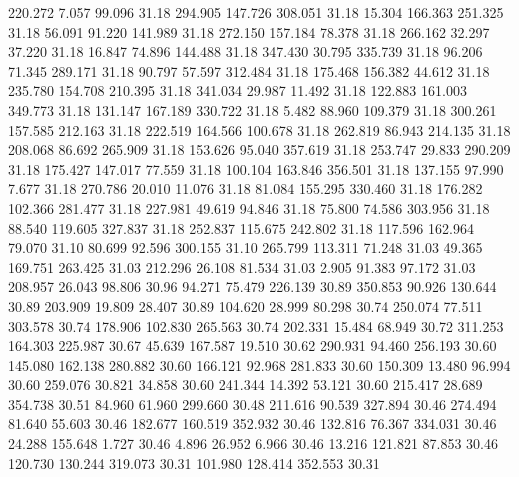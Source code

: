  220.272    7.057   99.096        31.18
 294.905  147.726  308.051        31.18
  15.304  166.363  251.325        31.18
  56.091   91.220  141.989        31.18
 272.150  157.184   78.378        31.18
 266.162   32.297   37.220        31.18
  16.847   74.896  144.488        31.18
 347.430   30.795  335.739        31.18
  96.206   71.345  289.171        31.18
  90.797   57.597  312.484        31.18
 175.468  156.382   44.612        31.18
 235.780  154.708  210.395        31.18
 341.034   29.987   11.492        31.18
 122.883  161.003  349.773        31.18
 131.147  167.189  330.722        31.18
   5.482   88.960  109.379        31.18
 300.261  157.585  212.163        31.18
 222.519  164.566  100.678        31.18
 262.819   86.943  214.135        31.18
 208.068   86.692  265.909        31.18
 153.626   95.040  357.619        31.18
 253.747   29.833  290.209        31.18
 175.427  147.017   77.559        31.18
 100.104  163.846  356.501        31.18
 137.155   97.990    7.677        31.18
 270.786   20.010   11.076        31.18
  81.084  155.295  330.460        31.18
 176.282  102.366  281.477        31.18
 227.981   49.619   94.846        31.18
  75.800   74.586  303.956        31.18
  88.540  119.605  327.837        31.18
 252.837  115.675  242.802        31.18
 117.596  162.964   79.070        31.10
  80.699   92.596  300.155        31.10
 265.799  113.311   71.248        31.03
  49.365  169.751  263.425        31.03
 212.296   26.108   81.534        31.03
   2.905   91.383   97.172        31.03
 208.957   26.043   98.806        30.96
  94.271   75.479  226.139        30.89
 350.853   90.926  130.644        30.89
 203.909   19.809   28.407        30.89
 104.620   28.999   80.298        30.74
 250.074   77.511  303.578        30.74
 178.906  102.830  265.563        30.74
 202.331   15.484   68.949        30.72
 311.253  164.303  225.987        30.67
  45.639  167.587   19.510        30.62
 290.931   94.460  256.193        30.60
 145.080  162.138  280.882        30.60
 166.121   92.968  281.833        30.60
 150.309   13.480   96.994        30.60
 259.076   30.821   34.858        30.60
 241.344   14.392   53.121        30.60
 215.417   28.689  354.738        30.51
  84.960   61.960  299.660        30.48
 211.616   90.539  327.894        30.46
 274.494   81.640   55.603        30.46
 182.677  160.519  352.932        30.46
 132.816   76.367  334.031        30.46
  24.288  155.648    1.727        30.46
   4.896   26.952    6.966        30.46
  13.216  121.821   87.853        30.46
 120.730  130.244  319.073        30.31
 101.980  128.414  352.553        30.31
